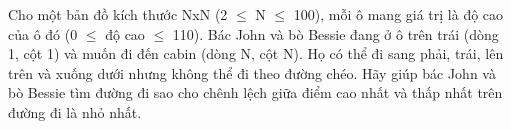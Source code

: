Cho một bản đồ kích thước NxN (2  $\le$  N  $\le$  100), mỗi ô mang giá trị là độ cao của ô đó (0  $\le$  độ cao  $\le$  110). Bác John và bò Bessie đang ở ô trên trái (dòng 1, cột 1) và muốn đi đến cabin (dòng N, cột N). Họ có thể đi sang phải, trái, lên trên và xuống dưới nhưng không thể đi theo đường chéo. Hãy giúp bác John và bò Bessie tìm đường đi sao cho chênh lệch giữa điểm cao nhất và thấp nhất trên đường đi là nhỏ nhất.  

\